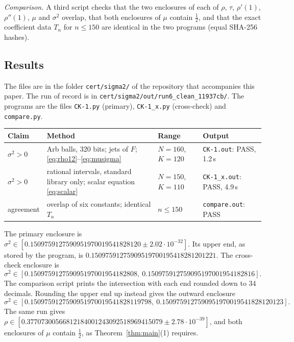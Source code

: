 \documentclass[11pt]{amsart}
\theoremstyle{definition}
\theoremstyle{remark}
\numberwithin{equation}{section}
\begin{document}
\emph{Comparison.} A third script checks that the two enclosures of each of \(\rho\), \(\tau\), \(\rho'(1)\), \(\rho''(1)\), \(\mu\) and \(\sigma^2\) overlap, that both enclosures of \(\mu\) contain \(\frac12\), and that the exact coefficient data \(T_n\) for \(n\le150\) are identical in the two programs (equal SHA-256 hashes).

\subsection{Results}

The files are in the folder \nolinkurl{cert/sigma2/} of the repository that accompanies this paper. The run of record is in \nolinkurl{cert/sigma2/out/run6_clean_11937cb/}. The programs are the files \nolinkurl{CK-1.py} (primary), \nolinkurl{CK-1_x.py} (cross-check) and \nolinkurl{compare.py}.

\begin{center}
\small
\setlength{\tabcolsep}{4pt}
\begin{tabular}{p{}p{}p{}p{}}
\toprule
Claim & Method & Range & Output \\
\midrule
\(\sigma^2>0\) & Arb balls, 320 bits; jets of \(F\); \eqref{eq:rho12}--\eqref{eq:musigma} & \(N=160\), \(K=120\) & \nolinkurl{CK-1.out}: PASS, 1.2\,s \\
\(\sigma^2>0\) & rational intervals, standard library only; scalar equation \eqref{eq:scalar} & \(N=150\), \(K=110\) & \nolinkurl{CK-1_x.out}: PASS, 4.9\,s \\
agreement & overlap of six constants; identical \(T_n\) & \(n\le150\) & \nolinkurl{compare.out}: PASS \\
\bottomrule
\end{tabular}
\end{center}

The primary enclosure is \(\sigma^2\in[0.1509759127590951970019541828120\pm2.02\cdot10^{-32}]\). Its upper end, as stored by the program, is \(0.15097591275909519700195418281201221\). The cross-check enclosure is
\[
\sigma^2\in[0.150975912759095197001954182808,\ 0.150975912759095197001954182816].
\]
The comparison script prints the intersection with each end rounded down to 34 decimals. Rounding the upper end up instead gives the outward enclosure
\[
\sigma^2\in[0.1509759127590951970019541828119798,\ 0.1509759127590951970019541828120123].
\]
The same run gives \(\rho\in[0.37707300566812184001243092518969415079\pm2.78\cdot10^{-39}]\), and both enclosures of \(\mu\) contain \(\frac12\), as Theorem~\ref{thm:main}(1) requires.
\end{document}
